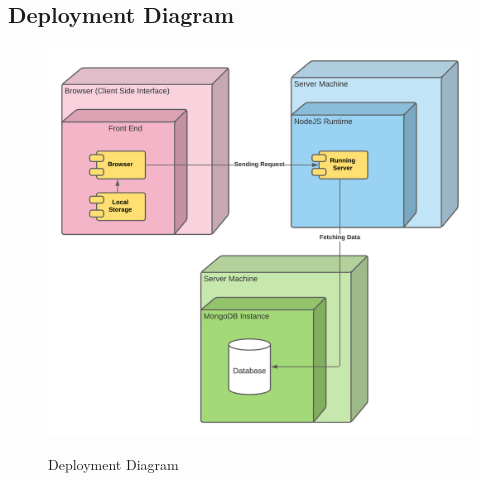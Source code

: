 \subsection{Deployment Diagram}
\begin{figure}[H]
    \centering
    \caption{Deployment Diagram}
    \includegraphics[scale=0.6]{./diagrams/deployment-diagram.png}
    \label{fig:deployment}
\end{figure}
